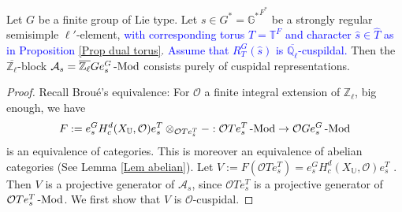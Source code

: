 	\begin{theorem}\label{Pure Cuspidality}
		Let $G$ be a finite group of Lie type. Let $s \in G^*=\mathbb{G^*}^{F^*}$ be a strongly regular semisimple $\ell'$-element, \textcolor{blue}{with corresponding torus $T=\mathbb{T}^F$ and character $\hat{s} \in \hat{T}$ as in Proposition \ref{Prop dual torus}}. \textcolor{blue}{Assume that $R_T^G(\hat{s})$ is $\overline{\mathbb{Q}_{\ell}}$-cuspildal.} Then the $\overline{\mathbb{Z}_{\ell}}$-block $\mathcal{A}_s=\overline{\mathbb{Z}_{\ell}}Ge_s^G\operatorname{-Mod}$ consists purely of cuspidal representations.
	\end{theorem}
	
	\begin{proof}
		
		Recall Broué's equivalence: For $\mathcal{O}$ a finite integral extension of $\mathbb{Z}_{\ell}$, big enough, we have
		$$F:=e_s^GH^d_c(X_{\mathbb{U}}, \mathcal{O})e_s^T\otimes_{\mathcal{O}Te_s^T}-: \mathcal{O}Te_s^T\operatorname{-Mod} \to \mathcal{O}Ge_s^G\operatorname{-Mod}$$ is an equivalence of categories. This is moreover an equivalence of abelian categories (See Lemma \ref{Lem abelian}). Let $V:=F(\mathcal{O}Te_s^T)=e_s^GH^d_c(X_{\mathbb{U}}, \mathcal{O})e_s^T$ %
		. Then $V$ is a projective generator of $\mathcal{A}_s$, since $\mathcal{O}Te_s^T$ is a projective generator of $\mathcal{O}Te_s^T\operatorname{-Mod}$. We first show that $V$ is $\mathcal{O}$-cuspidal.
		

\end{proof}
